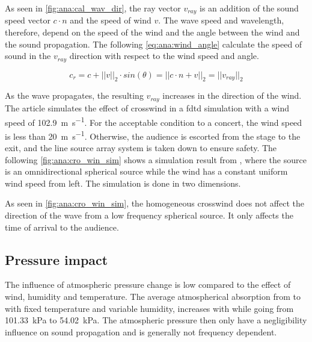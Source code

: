 As seen in \autoref{fig:ana:cal_wav_dir}, the ray vector $v_{ray}$ is an addition of the sound speed vector $c \cdot n$ and the speed of wind $v$. The wave speed and wavelength, therefore, depend on the speed of the wind and the angle between the wind and the sound propagation. The following \autoref{eq:ana:wind_angle} calculate the speed of sound in the $v_{ray}$ direction with respect to the wind speed and angle.



\begin{equation}\label{eq:ana:wind_angle}
c_r = c+||v||_2 \cdot sin(\theta) = ||c \cdot n + v||_2 = ||v_{ray}||_2
\end{equation}

\startexplain
{}
\stopexplain



As the wave propagates, the resulting $v_{ray}$ increases in the direction of the wind. The article \citep{crosswind_simulation} simulates the effect of crosswind in a \gls{fdtd} simulation with a wind speed of \SI{102.9}{\meter\per\second}. For the acceptable condition to a concert, the wind speed is less than \SI{20}{\meter\per\second}. Otherwise, the audience is escorted from the stage to the exit, and the line source array system is taken down to ensure safety. The following \autoref{fig:ana:cro_win_sim} shows a simulation result from \citep{crosswind_simulation}, where the source is an omnidirectional  spherical source while the wind has a constant uniform wind speed from left. The simulation is done in two dimensions.




As seen in \autoref{fig:ana:cro_win_sim}, the homogeneous crosswind does not affect the direction of the wave from a low frequency spherical source. It only affects the time of arrival to the audience.

\subsection{Pressure impact}\label{sub:sec:pre_imp}
The influence of atmospheric pressure change is low compared to the effect of wind, humidity and temperature. The average atmospherical absorption from  to  with fixed temperature and variable humidity, increases with  while going from \SI{101.33}{\kilo\pascal} to \SI{54.02}{\kilo\pascal}. The atmospheric pressure then only have a negligibility influence on sound propagation and is generally not frequency dependent. 

